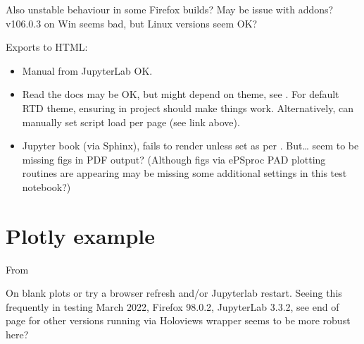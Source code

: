 \documentclass[letterpaper,10pt,english]{jupyterBook}
\begin{document}
\sphinxAtStartPar
Also unstable behaviour in some Firefox builds? May be issue with add\sphinxhyphen{}ons? v106.0.3 on Win seems bad, but Linux versions seem OK?

\sphinxAtStartPar
Exports to HTML:
\begin{itemize}
\item {} 
\sphinxAtStartPar
Manual from JupyterLab OK.

\item {} 
\sphinxAtStartPar
Read the docs may be OK, but might depend on theme, see . For default RTD theme, ensuring  in project  should make things work. Alternatively, can manually set script load per page (see link above).

\item {} 
\sphinxAtStartPar
Jupyter book (via Sphinx), fails to render unless  set as per . But… seem to be missing figs in PDF output? (Although figs via ePSproc PAD plotting routines are appearing \sphinxhyphen{} may be missing some additional settings in this test notebook?)

\end{itemize}


\section{Plotly example}
\label{\detokenize{tests/plotly_surface_render_test:plotly-example}}
\sphinxAtStartPar
From 

\sphinxAtStartPar
On blank plots or  try a browser refresh and/or Jupyterlab restart. Seeing this frequently in testing March 2022, Firefox 98.0.2, JupyterLab 3.3.2, see end of page for other versions \sphinxhyphen{} running via Holoviews wrapper seems to be more robust here?
\end{document}
